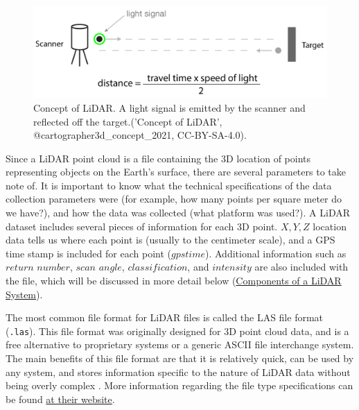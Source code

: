 \documentclass[
]{book}
\begin{document}
\begin{figure}
\includegraphics[width=0.8\linewidth]{images/15-Concept-of-LiDAR} \caption{Concept of LiDAR. A light signal is emitted by the scanner and reflected off the target.('Concept of LiDAR', @cartographer3d_concept_2021, CC-BY-SA-4.0).}\label{fig:15-Concept-of-LiDAR}
\end{figure}

Since a LiDAR point cloud is a file containing the 3D location of points representing objects on the Earth's surface, there are several parameters to take note of. It is important to know what the technical specifications of the data collection parameters were (for example, how many points per square meter do we have?), and how the data was collected (what platform was used?). A LiDAR dataset includes several pieces of information for each 3D point. \(X,Y,Z\) location data tells us where each point is (usually to the centimeter scale), and a GPS time stamp is included for each point (\(gpstime\)). Additional information such as \(return\) \(number\), \(scan\) \(angle\), \(classification\), and \(intensity\) are also included with the file, which will be discussed in more detail below (\protect\hyperlink{components-of-a-lidar-system}{Components of a LiDAR System}).

The most common file format for LiDAR files is called the LAS file format (\texttt{.las}). This file format was originally designed for 3D point cloud data, and is a free alternative to proprietary systems or a generic ASCII file interchange system. The main benefits of this file format are that it is relatively quick, can be used by any system, and stores information specific to the nature of LiDAR data without being overly complex \citep{american_society_for_photogrammetry__remote_sensing_laser_2019}. More information regarding the file type specifications can be found \href{https://www.asprs.org/divisions-committees/lidar-division/laser-las-file-format-exchange-activities}{at their website}.
\end{document}

